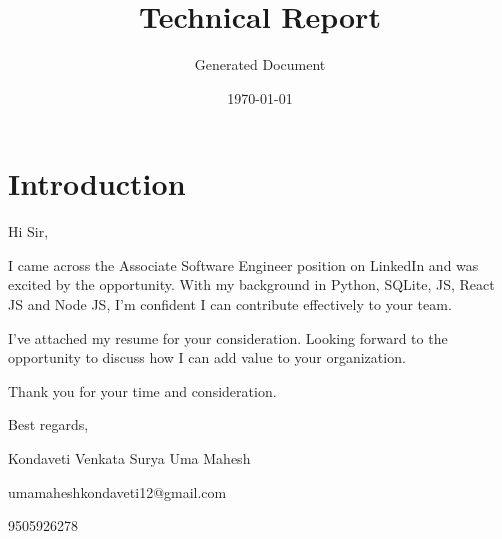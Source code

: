 \documentclass[12pt]{report}
\title{Technical Report}
\author{Generated Document}
\date{\today}
\begin{document}
\maketitle
\tableofcontents
\newpage

\chapter{Introduction}

Hi Sir,

I came across the Associate Software Engineer position on LinkedIn and was excited by the opportunity. With my background in Python, SQLite, JS, React JS and Node JS, I’m confident I can contribute effectively to your team.

I've attached my resume for your consideration. Looking forward to the opportunity to discuss how I can add value to your organization.

Thank you for your time and consideration.

Best regards,

Kondaveti Venkata Surya Uma Mahesh

umamaheshkondaveti12@gmail.com

9505926278
\end{document}
